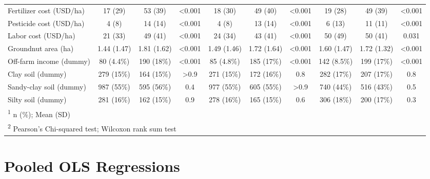 \documentclass[
]{article}
\begin{document}
\begin{landscape}
\begin{table}[!h]
{\begin{tabular}[t]{lccccccccc}
Fertilizer cost (USD/ha) & 17 (29) & 53 (39) & <0.001 & 18 (30) & 49 (40) & <0.001 & 19 (28) & 49 (39) & <0.001\\
Pesticide cost (USD/ha) & 4 (8) & 14 (14) & <0.001 & 4 (8) & 13 (14) & <0.001 & 6 (13) & 11 (11) & <0.001\\
\addlinespace
Labor cost (USD/ha) & 21 (33) & 49 (41) & <0.001 & 24 (34) & 43 (41) & <0.001 & 50 (49) & 50 (41) & 0.031\\
Groundnut area (ha) & 1.44 (1.47) & 1.81 (1.62) & <0.001 & 1.49 (1.46) & 1.72 (1.64) & <0.001 & 1.60 (1.47) & 1.72 (1.32) & <0.001\\
Off-farm income (dummy) & 80 (4.4\%) & 190 (18\%) & <0.001 & 85 (4.8\%) & 185 (17\%) & <0.001 & 142 (8.5\%) & 199 (17\%) & <0.001\\
Clay soil (dummy) & 279 (15\%) & 164 (15\%) & >0.9 & 271 (15\%) & 172 (16\%) & 0.8 & 282 (17\%) & 207 (17\%) & 0.8\\
Sandy-clay soil (dummy) & 987 (55\%) & 595 (56\%) & 0.4 & 977 (55\%) & 605 (55\%) & >0.9 & 740 (44\%) & 516 (43\%) & 0.5\\
\addlinespace
Silty soil (dummy) & 281 (16\%) & 162 (15\%) & 0.9 & 278 (16\%) & 165 (15\%) & 0.6 & 306 (18\%) & 200 (17\%) & 0.3\\
\bottomrule
\multicolumn{10}{l}{\rule{0pt}{1em}\textsuperscript{1} n (\%); Mean (SD)}\\
\multicolumn{10}{l}{\rule{0pt}{1em}\textsuperscript{2} Pearson's Chi-squared test; Wilcoxon rank sum test}\\
\end{tabular}}
\end{table}
\end{landscape}
\newpage

\hypertarget{pooled-ols-regressions}{%
\section{Pooled OLS Regressions}\label{pooled-ols-regressions}}

\begingroup\fontsize{7}{9}\selectfont
\end{document}
